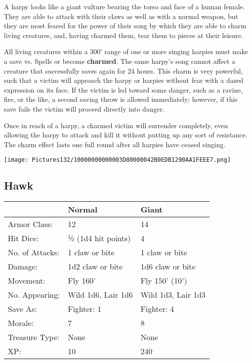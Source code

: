 \documentclass[a4paper,twoside,openany,10pt]{book}
\begin{document}
\begin{multicols}{2}
A harpy looks like a giant vulture bearing the torso and face of a human female. They are able to attack with their claws as well as with a normal weapon, but they are most feared for the power of their song by which they are able to charm living creatures, and, having charmed them, tear them to pieces at their leisure.

All living creatures within a 300' range of one or more singing harpies must make a save vs. Spells or become \textbf{charmed}. The same harpy's song cannot affect a creature that successfully saves again for 24 hours. This charm is very powerful, such that a victim will approach the harpy or harpies without fear with a dazed expression on its face. If the victim is led toward some danger, such as a ravine, fire, or the like, a second saving throw is allowed immediately; however, if this save fails the victim will proceed directly into danger.

Once in reach of a harpy, a charmed victim will surrender completely, even allowing the harpy to attack and kill it without putting up any sort of resistance. The charm effect lasts one full round after all harpies have ceased singing.

\begin{center}
	\texttt{[image: Pictures132/10000000000003D80000042B0EDB1290AA1FEEE7.png]}
\end{center}

\subsection*{Hawk}\label{hawk}

\begin{tabularx}{0.48\textwidth}{@{}llX@{}}
& Normal & Giant \\\hline
Armor Class: & 12 & 14 \\\hline
Hit Dice: & ½ (1d4 hit points) & 4 \\\hline
No. of Attacks: & 1 claw or bite & 1 claw or bite \\\hline
Damage: & 1d2 claw or bite & 1d6 claw or bite \\\hline
Movement: & Fly 160' & Fly 150'
(10') \\\hline
No. Appearing: & Wild 1d6, Lair 1d6 & Wild 1d3, Lair 1d3 \\\hline
Save As: & Fighter: 1 & Fighter: 4 \\\hline
Morale: & 7 & 8 \\\hline
Treasure Type: & None & None \\\hline
XP: & 10 & 240 \\\hline
\end{tabularx}\medskip


\end{multicols}
\end{document}
